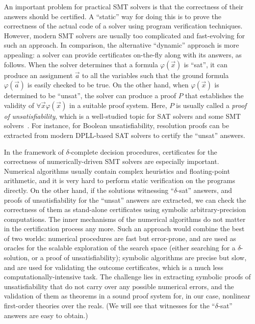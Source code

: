 \documentclass[envcountsect]{llncs}
\begin{document}
An important problem for practical SMT solvers is that the correctness
of
their answers should be certified. A ``static'' way for doing this is to prove
the correctness of the actual code of a solver using program verification
techniques. However, modern SMT solvers are usually too complicated and
fast-evolving for such an approach. In comparison, the alternative ``dynamic''
approach is more appealing: a solver can provide certificates on-the-fly along
with its answers, as follows. When the solver determines that a formula
$\varphi(\vec x)$ is ``sat'', it can produce an assignment $\vec a$ to all the
variables such that the ground formula $\varphi(\vec a)$ is easily checked to be
true. On the other hand, when $\varphi(\vec x)$ is determined to be ``unsat'',
the solver can produce a proof $P$ that establishes the validity of $\forall
\vec x \varphi(\vec x)$ in a suitable proof system. Here, $P$ is usually called
a {\em proof of unsatisfiability}, which is a well-studied topic for SAT solvers
and some SMT solvers~\cite{}. For instance, for Boolean unsatisfiability,
resolution proofs can be extracted from modern DPLL-based SAT solvers to certify
the ``unsat'' answers.

In the framework of $\delta$-complete decision procedures, certificates for
the correctness of numerically-driven SMT solvers are especially important.
Numerical algorithms usually contain complex heuristics and floating-point
arithmetic, and it is very hard to perform static verification on the programs
directly. On the other hand, if the solutions witnessing ``$\delta$-sat''
answers, and proofs of unsatisfiability for the ``unsat'' answers are extracted,
we can check the correctness of them as stand-alone certificates using symbolic
arbitrary-precision computations. The inner mechanisms of the numerical
algorithms do not matter in the certification process any more. Such an approach
 would combine the best of two worlds: numerical procedures are
fast but error-prone, and are used as oracles for the scalable exploration of
the search space (either searching for a $\delta$-solution, or a proof of
unsatisfiability); symbolic algorithms are precise but slow, and are used for
validating the outcome certificates, which is a much less
computationally-intensive task. The challenge lies in
extracting symbolic proofs of unsatisfiability that do not carry over any
possible numerical errors, and the validation of them as theorems in a sound
proof system for, in our case, nonlinear first-order theories over the reals.
(We will see that witnesses for the ``$\delta$-sat'' answers are easy to
obtain.)
\end{document}

